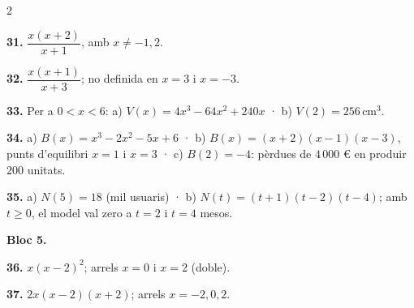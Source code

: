 \documentclass[13pt,a4paper]{extarticle}
\begin{document}
\begin{multicols}{2}
\begin{minipage}{\linewidth}
\textbf{31.} $\dfrac{x(x+2)}{x+1}$, amb $x\neq-1,2$.\par
\end{minipage}\par\vspace{1.6mm}
\par\noindent\begin{minipage}{\linewidth}
\textbf{32.} $\dfrac{x(x+1)}{x+3}$; no definida en $x=3$ i $x=-3$.\par
\end{minipage}\par\vspace{1.6mm}
\par\noindent\begin{minipage}{\linewidth}
\textbf{33.} Per a $0<x<6$: a) $V(x)=4x^3-64x^2+240x$ · b) $V(2)=256\,\text{cm}^3$.\par
\end{minipage}\par\vspace{1.6mm}
\par\noindent\begin{minipage}{\linewidth}
\textbf{34.} a) $B(x)=x^3-2x^2-5x+6$ · b) $B(x)=(x+2)(x-1)(x-3)$, punts d'equilibri $x=1$ i $x=3$ · c) $B(2)=-4$: pèrdues de $4\,000$ € en produir $200$ unitats.\par
\end{minipage}\par\vspace{1.6mm}
\par\noindent\begin{minipage}{\linewidth}
\textbf{35.} a) $N(5)=18$ (mil usuaris) · b) $N(t)=(t+1)(t-2)(t-4)$; amb $t\geq0$, el model val zero a $t=2$ i $t=4$ mesos.\par
\end{minipage}\par\vspace{1.6mm}
\textbf{Bloc 5.}\par
\par\noindent\begin{minipage}{\linewidth}
\textbf{36.} $x(x-2)^2$; arrels $x=0$ i $x=2$ (doble).\par
\end{minipage}\par\vspace{1.6mm}
\par\noindent\begin{minipage}{\linewidth}
\textbf{37.} $2x(x-2)(x+2)$; arrels $x=-2,0,2$.\par

\end{minipage}
\end{multicols}
\end{document}

